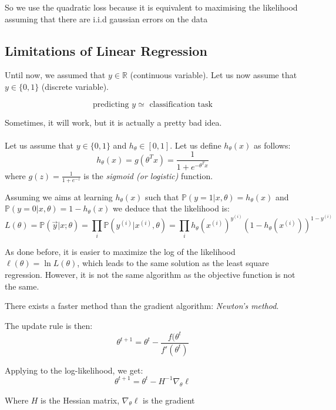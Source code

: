 \documentclass{article}
\begin{document}
So we use the quadratic loss because it is equivalent to maximising the likelihood assuming that there are i.i.d gaussian errors on the data






\subsection{Limitations of Linear Regression}
Until now, we assumed that $y\in \mathbb{R}$ (continuous variable). Let us now assume that $y \in \{0,1\}$ (discrete variable).

\[\text{predicting }y \simeq \text{ classification task}\]

Sometimes, it will work, but it is actually a pretty bad idea.
\bigskip	

\paragraph{} Let us assume that $y\in \{0,1\}$ and $h_{\theta} \in [0,1]$. Let us define $h_\theta(x)$ as follows:
\[h_{\theta}(x)=g(\theta^Tx)=\frac{1}{1+e^{-\theta^Tx}}\]
where $g(z)=\frac{1}{1+e^{-z}}$ is the \emph{sigmoid (or logistic)} function.
\bigskip

Assuming we aims at learning $h_\theta(x)$ such that $\mathbb{P}(y=1|x,\theta)=h_\theta(x)$ and $\mathbb{P}(y=0|x,\theta)=1-h_\theta(x)$ we deduce that the likelihood is:
\[L(\theta) = \mathbb{P}(\vec{y}|x;\theta) = \prod_{i} \mathbb{P}(y^{(i)}|x^{(i)},\theta) = \prod_{i}h_\theta ( x^{(i)})^{y^{(i)}}(1-h_\theta(x^{(i)}))^{1-y^{(i)}}\]


As done before, it is easier to maximize the log of the likelihood $\ell(\theta)=\ln L(\theta)$, which leads to the same solution as the least square regression. However, it is not the same algorithm as the objective function is not the same.
\bigskip

There exists a faster method than the gradient algorithm: \emph{Newton's method}.

The update rule is then:
\[\theta^{t+1}=\theta^{t}-\dfrac{f(\theta^t}{f'(\theta^t)}\]

Applying to the log-likelihood, we get:
\[\theta^{t+1}=\theta^{t}-H^{-1}\nabla_\theta \ell\]

Where $H$ is the Hessian matrix, $\nabla_\theta \ell$ is the gradient
\end{document}
